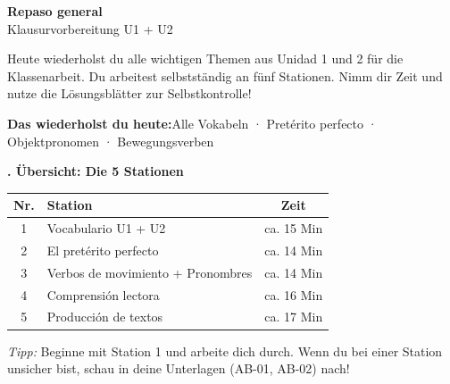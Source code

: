 \documentclass[11pt, a4paper]{article}
\newcommand{\thema}{Repaso general}
\newcommand{\untertitel}{Klausurvorbereitung U1 + U2}
\newcommand{\lernziele}{Alle Vokabeln · Pretérito perfecto · Objektpronomen · Bewegungsverben}
\newcommand{\abschnitt}[2]{\noindent\textbf{\large #1. #2}}
\begin{document}
\begin{center}
    {\LARGE\bfseries \thema}\\[3pt]
    {\small \untertitel}
\end{center}

\vspace{4pt}

Heute wiederholst du alle wichtigen Themen aus Unidad 1 und 2 für die Klassenarbeit. Du arbeitest selbstständig an fünf Stationen. Nimm dir Zeit und nutze die Lösungsblätter zur Selbstkontrolle!

\vspace{2pt}

\begin{lernzielbox}
\textbf{Das wiederholst du heute:}\quad \lernziele
\end{lernzielbox}


\abschnitt{}{Übersicht: Die 5 Stationen}

\vspace{4pt}

\begin{stationbox}
\begin{tabular}{@{}clc@{}}
\textbf{Nr.} & \textbf{Station} & \textbf{Zeit} \\
\midrule
1 & Vocabulario U1 + U2 & ca. 15 Min \\
2 & El pretérito perfecto & ca. 14 Min \\
3 & Verbos de movimiento + Pronombres & ca. 14 Min \\
4 & Comprensión lectora & ca. 16 Min \\
5 & Producción de textos & ca. 17 Min \\
\end{tabular}
\end{stationbox}

\vspace{4pt}

\begin{tippbox}
\footnotesize\textit{Tipp:} Beginne mit Station 1 und arbeite dich durch. Wenn du bei einer Station unsicher bist, schau in deine Unterlagen (AB-01, AB-02) nach!
\end{tippbox}

\end{document}
